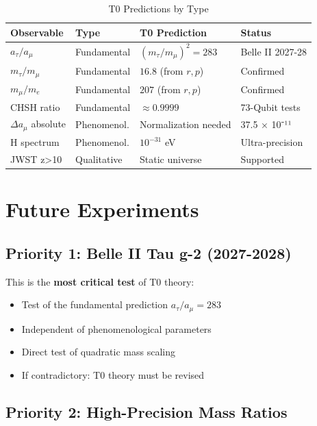 \begin{table}[h]
	\centering
	\caption{T0 Predictions by Type}
	\begin{tabularx}{\textwidth}{|X|X|X|X|}
		\hline
		\textbf{Observable} & \textbf{Type} & \textbf{T0 Prediction} & \textbf{Status} \\
		\hline
		$a_\tau/a_\mu$ & Fundamental & $(m_\tau/m_\mu)^2 = 283$ & Belle II 2027-28 \\
		\hline
		$m_\tau/m_\mu$ & Fundamental & $16.8$ (from $r,p$) & Confirmed \checkmark \\
		\hline
		$m_\mu/m_e$ & Fundamental & $207$ (from $r,p$) & Confirmed \checkmark \\
		\hline
		CHSH ratio & Fundamental & $\approx 0.9999$ & 73-Qubit tests \\
		\hline
		$\Delta a_\mu$ absolute & Phenomenol. & Normalization needed & 37.5 × 10⁻¹¹ \\
		\hline
		H spectrum & Phenomenol. & $10^{-31}$ eV & Ultra-precision \\
		\hline
		JWST z>10 & Qualitative & Static universe & Supported \\
		\hline
	\end{tabularx}
\end{table}

\section{Future Experiments}

\subsection{Priority 1: Belle II Tau g-2 (2027-2028)}

This is the \textbf{most critical test} of T0 theory:
\begin{itemize}
	\item Test of the fundamental prediction $a_\tau/a_\mu = 283$
	\item Independent of phenomenological parameters
	\item Direct test of quadratic mass scaling
	\item If contradictory: T0 theory must be revised
\end{itemize}

\subsection{Priority 2: High-Precision Mass Ratios}

